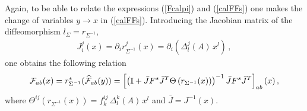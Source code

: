 \documentclass[12pt,a4paper]{article}
\numberwithin{equation}{section}
\theoremstyle{definition}
\begin{document}
Again, to be able to relate the expressions (\ref{Fcalpi}) and (\ref{calFFs}) one makes the change of variables $y\to x$ in (\ref{calFFs}). Introducing the Jacobian matrix of the diffeomorphism $l_{\Sigma} = r_{\Sigma^{-1}}$,
\begin{eqnarray}
J^j_i(x)=\partial_i r^j_{\Sigma^{-1}}(x)=\partial_i\left(\Delta^j_l(A)\,x^l\right)\,,
\end{eqnarray} 
one obtains the following relation
\begin{equation}\label{FFs relation}
\mathcal{F}_{ab}(x) =r_{\Sigma^{-1}}^*(\widehat{\cal F}_{ab}(y))= \left[\left(\mathbb{I}+\bar JF^s\bar J^T\Theta\left(r_{\Sigma^{-1}}(x)\right)\right)^{-1}\bar JF^s\bar J^T\right]_{ab}(x)\,,
\end{equation}
where $\Theta^{ij}\left(r_{\Sigma^{-1}}(x)\right)=f^{ij}_k\,\Delta^k_l(A)\,x^l$ and $\bar J=J^{-1}(x)$.
\end{document}
